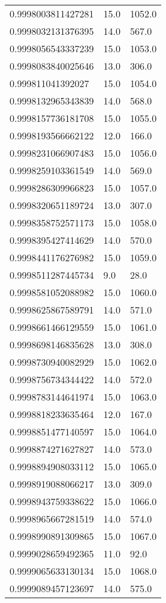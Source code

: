 \begin{center}
\begin{supertabular}[H]{p{0.30\textwidth}p{0.05\textwidth}p{0.05\textwidth}}
0.9998003811427281 & 15.0 & 1052.0 \\ 
0.9998032131376395 & 14.0 & 567.0 \\ 
0.9998056543337239 & 15.0 & 1053.0 \\ 
0.9998083840025646 & 13.0 & 306.0 \\ 
0.999811041392027 & 15.0 & 1054.0 \\ 
0.9998132965343839 & 14.0 & 568.0 \\ 
0.9998157736181708 & 15.0 & 1055.0 \\ 
0.9998193566662122 & 12.0 & 166.0 \\ 
0.9998231066907483 & 15.0 & 1056.0 \\ 
0.9998259103361549 & 14.0 & 569.0 \\ 
0.9998286309966823 & 15.0 & 1057.0 \\ 
0.9998320651189724 & 13.0 & 307.0 \\ 
0.9998358752571173 & 15.0 & 1058.0 \\ 
0.9998395427414629 & 14.0 & 570.0 \\ 
0.9998441176276982 & 15.0 & 1059.0 \\ 
0.9998511287445734 & 9.0 & 28.0 \\ 
0.9998581052088982 & 15.0 & 1060.0 \\ 
0.9998625867589791 & 14.0 & 571.0 \\ 
0.9998661466129559 & 15.0 & 1061.0 \\ 
0.9998698146835628 & 13.0 & 308.0 \\ 
0.9998730940082929 & 15.0 & 1062.0 \\ 
0.9998756734344422 & 14.0 & 572.0 \\ 
0.9998783144641974 & 15.0 & 1063.0 \\ 
0.9998818233635464 & 12.0 & 167.0 \\ 
0.9998851477140597 & 15.0 & 1064.0 \\ 
0.9998874271627827 & 14.0 & 573.0 \\ 
0.9998894908033112 & 15.0 & 1065.0 \\ 
0.9998919088066217 & 13.0 & 309.0 \\ 
0.9998943759338622 & 15.0 & 1066.0 \\ 
0.9998965667281519 & 14.0 & 574.0 \\ 
0.9998990891309865 & 15.0 & 1067.0 \\ 
0.9999028659492365 & 11.0 & 92.0 \\ 
0.9999065633130134 & 15.0 & 1068.0 \\ 
0.9999089457123697 & 14.0 & 575.0 \\ 

\end{supertabular}
\end{center}
